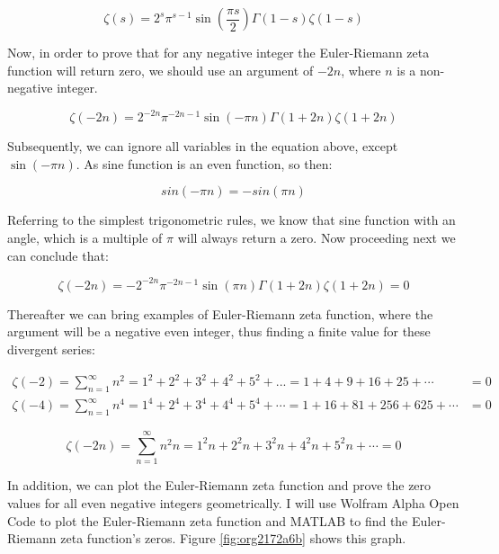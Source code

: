\documentclass[a4paper]{article}
\begin{document}
\begin{equation}
  \zeta(s)=2^s\pi^{s-1}\sin(\frac{\pi s}{2})\Gamma(1-s)\zeta(1-s)
  \end{equation}

Now, in order to prove that for any negative integer the Euler-Riemann zeta
function will return zero, we should use an argument of \(-2n\), where \(n\) is a
non-negative integer. 

\begin{equation}
  \zeta(-2n)=2^{-2n}\pi^{-2n-1}\sin(-\pi n)\Gamma(1+2n)\zeta(1+2n)
  \end{equation}

Subsequently, we can ignore all variables in the equation above, except
\(\sin(-\pi n)\). As sine function is an even function, so then:

\begin{equation}
  sin(-\pi n)=-sin(\pi n)
  \end{equation}

Referring to the simplest trigonometric rules, we know that sine function with
an angle, which is a multiple of \(\pi\) will always return a zero. Now proceeding
next we can conclude that: 

\begin{equation*}
  \zeta(-2n)=-2^{-2n}\pi^{-2n-1}\sin(\pi n)\Gamma(1+2n)\zeta(1+2n)=0
  \end{equation*}

Thereafter we can bring examples of Euler-Riemann zeta function, where the
argument will be a negative even integer, thus finding a finite value for these
divergent series: 

\begin{align*}
  \zeta(-2)=\sum_{n=1}^{\infty} n^2=1^2+2^2+3^2+4^2+5^2+...=1+4+9+16+25+\cdots&=0\\
  \zeta(-4)=\sum_{n=1}^{\infty} n^4=1^4+2^4+3^4+4^4+5^4+\cdots=1+16+81+256+625+\cdots&=0
\end{align*}

\begin{equation}
\zeta(-2n)=\sum_{n=1}^{\infty} n^2n=1^2n+2^2n+3^2n+4^2n+5^2n+\cdots=0
  \end{equation}

In addition, we can plot the Euler-Riemann zeta function and prove the zero
values for all even negative integers geometrically. I will use Wolfram Alpha
Open Code to plot the Euler-Riemann zeta function and MATLAB to find the
Euler-Riemann zeta function's zeros. Figure \ref{fig:org2172a6b} shows this graph. 
\end{document}
